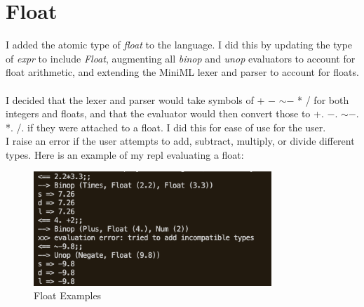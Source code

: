 \documentclass{article}
\begin{document}
\section{Float}
I added the atomic type of \textit{float} to the language. I did this by updating the type of \textit{expr} to include \textit{Float}, augmenting all \textit{binop} and \textit{unop} evaluators to account for float arithmetic, and extending the MiniML lexer and parser to account for floats. \\\\
I decided that the lexer and parser would take symbols of +  $ -$ $   {\sim}-$   *   / for both integers and floats, and that the evaluator would then convert those to  +. $-.$ ${\sim}-.$ *. /. if they were attached to a float. I did this for ease of use for the user.\\I raise an error if the user attempts to add, subtract, multiply, or divide different types.
Here is an example of my repl evaluating a float:\\
\begin{figure}[h]\begin{center}
    \includegraphics[width =0.8\textwidth]{Float.png}
    \caption{Float Examples}
\end{center} \end{figure}
\end{document}
